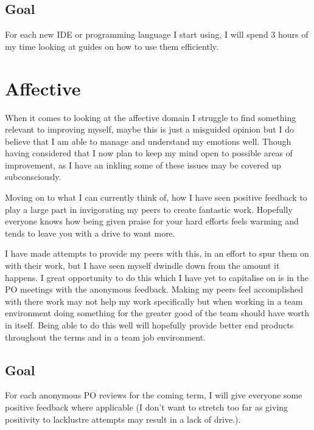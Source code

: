\documentclass{scrartcl}
\begin{document}
\subsection{Goal}
For each new IDE or programming language I start using, I will spend 3 hours of my time looking at guides on how to use them efficiently.

\section{Affective}
When it comes to looking at the affective domain I struggle to find something relevant to improving myself, maybe this is just a misguided opinion but I do believe that I am able to manage and understand my emotions well. Though having considered that I now plan to keep my mind open to possible areas of improvement, as I have an inkling some of these issues may be covered up subconsciously.

Moving on to what I can currently think of, how I have seen positive feedback to play a large part in invigorating my peers to create fantastic work. Hopefully everyone knows how being given praise for your hard efforts feels warming and tends to leave you with a drive to want more.

I have made attempts to provide my peers with this, in an effort to spur them on with their work, but I have seen myself dwindle down from the amount it happens. I great opportunity to do this which I have yet to capitalise on is in the PO meetings with the anonymous feedback. Making my peers feel accomplished with there work may not help my work specifically but when working in a team environment doing something for the greater good of the team should have worth in itself. Being able to do this well will hopefully provide better end products throughout the terms and in a team job environment.
\subsection{Goal}
For each anonymous PO reviews for the coming term, I will give everyone some positive feedback where applicable (I don't want to stretch too far as giving positivity to lacklustre attempts may result in a lack of drive.).
\end{document}

